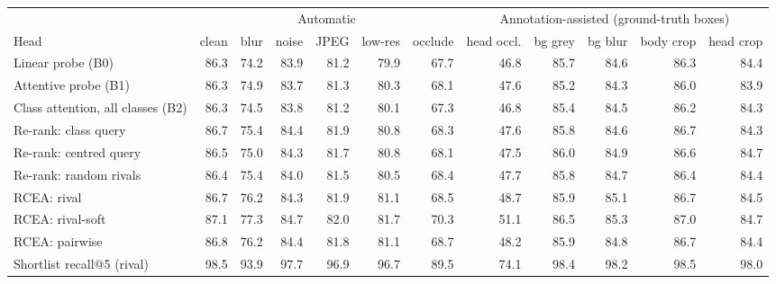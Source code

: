 \begin{tabular}{lrrrrrrrrrrr}
\toprule
 & \multicolumn{6}{c}{Automatic} & \multicolumn{5}{c}{Annotation-assisted (ground-truth boxes)} \\
\cmidrule(lr){2-7}\cmidrule(lr){8-12}
Head & clean & blur & noise & JPEG & low-res & occlude & head occl. & bg grey & bg blur & body crop & head crop \\
\midrule
Linear probe (B0) & 86.3 & 74.2 & 83.9 & 81.2 & 79.9 & 67.7 & 46.8 & 85.7 & 84.6 & 86.3 & 84.4 \\
Attentive probe (B1) & 86.3 & 74.9 & 83.7 & 81.3 & 80.3 & 68.1 & 47.6 & 85.2 & 84.3 & 86.0 & 83.9 \\
Class attention, all classes (B2) & 86.3 & 74.5 & 83.8 & 81.2 & 80.1 & 67.3 & 46.8 & 85.4 & 84.5 & 86.2 & 84.3 \\
Re-rank: class query & 86.7 & 75.4 & 84.4 & 81.9 & 80.8 & 68.3 & 47.6 & 85.8 & 84.6 & 86.7 & 84.3 \\
Re-rank: centred query & 86.5 & 75.0 & 84.3 & 81.7 & 80.8 & 68.1 & 47.5 & 86.0 & 84.9 & 86.6 & 84.7 \\
Re-rank: random rivals & 86.4 & 75.4 & 84.0 & 81.5 & 80.5 & 68.4 & 47.7 & 85.8 & 84.7 & 86.4 & 84.4 \\
RCEA: rival & 86.7 & 76.2 & 84.3 & 81.9 & 81.1 & 68.5 & 48.7 & 85.9 & 85.1 & 86.7 & 84.5 \\
RCEA: rival-soft & 87.1 & 77.3 & 84.7 & 82.0 & 81.7 & 70.3 & 51.1 & 86.5 & 85.3 & 87.0 & 84.7 \\
RCEA: pairwise & 86.8 & 76.2 & 84.4 & 81.8 & 81.1 & 68.7 & 48.2 & 85.9 & 84.8 & 86.7 & 84.4 \\
\midrule
Shortlist recall@5 (rival) & 98.5 & 93.9 & 97.7 & 96.9 & 96.7 & 89.5 & 74.1 & 98.4 & 98.2 & 98.5 & 98.0 \\
\bottomrule
\end{tabular}
